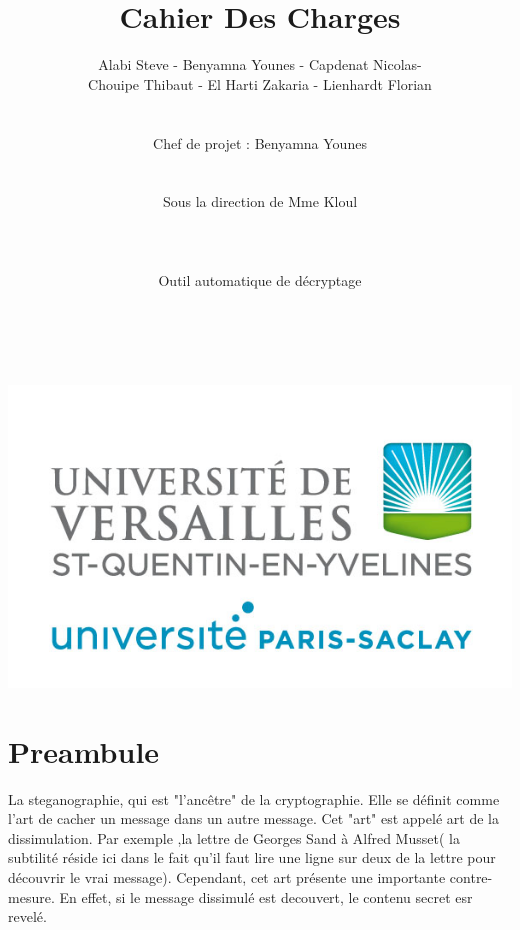\documentclass[a4]{article}
\begin{document}
	\title{\Huge{\textbf{Cahier Des Charges}}}
	\author{Alabi Steve - Benyamna Younes - Capdenat Nicolas- \\
		Chouipe Thibaut - El Harti Zakaria - Lienhardt Florian \\ \\ \\
		Chef de projet : Benyamna Younes \\ \\ \\ 
		Sous la direction de Mme Kloul \\ \\ \\ \\
		Outil automatique de décryptage \\ \\ \\}
		

	\begin{titlepage}
		\maketitle
		\vspace{20em}
		\begin{center}\includegraphics{logo_uvsq.jpg}\end{center}
	\end{titlepage}
	\section{Preambule}
			La steganographie, qui est "l'ancêtre" de la cryptographie. Elle se définit comme l'art de cacher un message dans un autre message. Cet "art"
			est appelé art de la dissimulation. 
			Par exemple ,la lettre de Georges Sand à Alfred Musset( la subtilité réside ici dans le fait qu'il faut lire une ligne sur deux de la lettre pour découvrir le vrai message).
			Cependant, cet art présente une importante contre-mesure. En effet, si le message dissimulé est decouvert, le contenu secret esr revelé.
\end{document}
